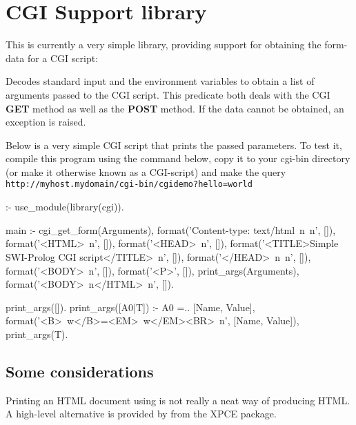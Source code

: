 \documentclass[11pt]{article}
\begin{document}
\section{CGI Support library}

This is currently a very simple library, providing support for obtaining
the form-data for a CGI script:

\begin{description}
Decodes standard input and the environment variables to obtain a list
of arguments passed to the CGI script.  This predicate both deals with
the CGI {\bf GET} method as well as the {\bf POST} method.  If the
data cannot be obtained, an  exception is
raised.
\end{description}

Below is a very simple CGI script that prints the passed parameters.
To test it, compile this program using the command below, copy it to
your cgi-bin directory (or make it otherwise known as a CGI-script) and
make the query \verb$http://myhost.mydomain/cgi-bin/cgidemo?hello=world$

\begin{code}
\end{code}

\noindent
\begin{code}
:- use_module(library(cgi)).

main :-
        cgi_get_form(Arguments),
        format('Content-type: text/html~n~n', []),
        format('<HTML>~n', []),
        format('<HEAD>~n', []),
        format('<TITLE>Simple SWI-Prolog CGI script</TITLE>~n', []),
        format('</HEAD>~n~n', []),
        format('<BODY>~n', []),
        format('<P>', []),
        print_args(Arguments),
        format('<BODY>~n</HTML>~n', []).

print_args([]).
print_args([A0|T]) :-
        A0 =.. [Name, Value],
        format('<B>~w</B>=<EM>~w</EM><BR>~n', [Name, Value]),
        print_args(T).
\end{code}

\noindent
\subsection{Some considerations}

Printing an HTML document using  is not really a neat way
of producing HTML.  A high-level alternative is provided by
 from the XPCE package.
\end{document}
